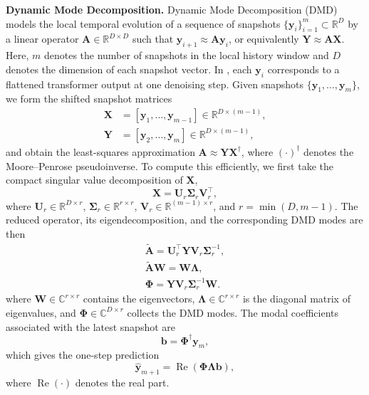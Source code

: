 \textbf{Dynamic Mode Decomposition.}
Dynamic Mode Decomposition (DMD) models the local temporal evolution
of a sequence of snapshots
$\{\mathbf{y}_i\}_{i=1}^m \subset \mathbb{R}^D$
by a linear operator $\mathbf{A} \in \mathbb{R}^{D \times D}$
such that $\mathbf{y}_{i+1} \approx \mathbf{A}\mathbf{y}_i$,
or equivalently $\mathbf{Y} \approx \mathbf{A}\mathbf{X}$.
Here, $m$ denotes the number of snapshots in the local history window
and $D$ denotes the dimension of each snapshot vector.
In ,
each $\mathbf{y}_i$ corresponds to a flattened transformer output
at one denoising step.
Given snapshots $\{\mathbf{y}_1, \ldots, \mathbf{y}_m\}$,
we form the shifted snapshot matrices
\begin{equation}
\begin{aligned}
    \mathbf{X} &= [\mathbf{y}_{1}, \ldots, \mathbf{y}_{m-1}]
    \in \mathbb{R}^{D \times (m-1)}, \\
    \mathbf{Y} &= [\mathbf{y}_{2}, \ldots, \mathbf{y}_{m}]
    \in \mathbb{R}^{D \times (m-1)},
\end{aligned}
\label{eq:method:xy}
\end{equation}
and obtain the least-squares approximation
$\mathbf{A} \approx \mathbf{Y}\mathbf{X}^{\dagger}$,
where $(\cdot)^{\dagger}$ denotes the Moore--Penrose pseudoinverse.
To compute this efficiently,
we first take the compact singular value decomposition of $\mathbf{X}$,
\begin{equation}
\mathbf{X} = \mathbf{U}_r \boldsymbol{\Sigma}_r \mathbf{V}_r^{\top},
\label{eq:method:svd}
\end{equation}
where
$\mathbf{U}_r \in \mathbb{R}^{D \times r}$,
$\boldsymbol{\Sigma}_r \in \mathbb{R}^{r \times r}$,
$\mathbf{V}_r \in \mathbb{R}^{(m-1) \times r}$,
and $r = \min(D, m-1)$.
The reduced operator, its eigendecomposition,
and the corresponding DMD modes are then
\begin{equation}
\begin{gathered}
\tilde{\mathbf{A}} = \mathbf{U}_r^{\top}\mathbf{Y}\mathbf{V}_r\boldsymbol{\Sigma}_r^{-1}, \\
\tilde{\mathbf{A}}\mathbf{W} = \mathbf{W}\boldsymbol{\Lambda}, \\
\mathbf{\Phi} = \mathbf{Y}\mathbf{V}_r\boldsymbol{\Sigma}_r^{-1}\mathbf{W}.
\end{gathered}
\label{eq:method:dmd-core}
\end{equation}
where $\mathbf{W} \in \mathbb{C}^{r \times r}$ contains the eigenvectors,
$\boldsymbol{\Lambda} \in \mathbb{C}^{r \times r}$ is the diagonal matrix
of eigenvalues, and $\mathbf{\Phi} \in \mathbb{C}^{D \times r}$
collects the DMD modes.
The modal coefficients associated with the latest snapshot are
\begin{equation}
\mathbf{b} = \mathbf{\Phi}^{\dagger}\mathbf{y}_m,
\label{eq:method:coeff}
\end{equation}
which gives the one-step prediction
\begin{equation}
\hat{\mathbf{y}}_{m+1}
= \operatorname{Re}\!\left(\mathbf{\Phi}\boldsymbol{\Lambda}\mathbf{b}\right),
\label{eq:method:dmd:predict-discrete}
\end{equation}
where $\operatorname{Re}(\cdot)$ denotes the real part.

